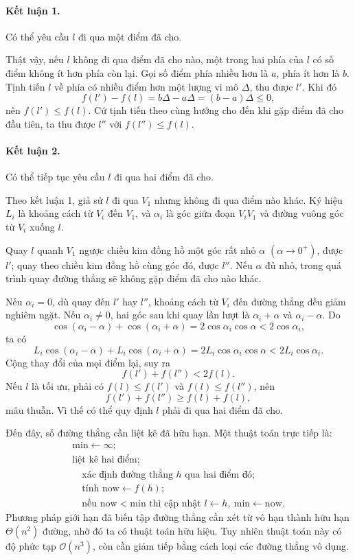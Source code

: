 \documentclass[11pt]{article}
\newcommand{\Oh}{\mathcal{O}}
\begin{document}
\paragraph{Kết luận 1.}
Có thể yêu cầu \(l\) đi qua một điểm đã cho.

Thật vậy, nếu \(l\) không đi qua điểm đã cho nào, một trong hai phía của \(l\)
có số điểm không ít hơn phía còn lại. Gọi số điểm phía nhiều hơn là \(a\), phía
ít hơn là \(b\). Tịnh tiến \(l\) về phía có nhiều điểm hơn một lượng vi mô
\(\Delta\), thu được \(l'\). Khi đó
\[
  f(l')-f(l)=b\Delta-a\Delta=(b-a)\Delta\le0,
\]
nên \(f(l')\le f(l)\). Cứ tịnh tiến theo cùng hướng cho đến khi gặp điểm đã
cho đầu tiên, ta thu được \(l''\) với \(f(l'')\le f(l)\).

\paragraph{Kết luận 2.}
Có thể tiếp tục yêu cầu \(l\) đi qua hai điểm đã cho.

Theo kết luận 1, giả sử \(l\) đi qua \(V_1\) nhưng không đi qua điểm nào khác.
Ký hiệu \(L_i\) là khoảng cách từ \(V_i\) đến \(V_1\), và \(\alpha_i\) là góc
giữa đoạn \(V_iV_1\) và đường vuông góc từ \(V_i\) xuống \(l\).

Quay \(l\) quanh \(V_1\) ngược chiều kim đồng hồ một góc rất nhỏ \(\alpha\)
\((\alpha\to0^+)\), được \(l'\); quay theo chiều kim đồng hồ cùng góc đó, được
\(l''\). Nếu \(\alpha\) đủ nhỏ, trong quá trình quay đường thẳng sẽ không gặp
điểm đã cho nào khác.

Nếu \(\alpha_i=0\), dù quay đến \(l'\) hay \(l''\), khoảng cách từ \(V_i\) đến
đường thẳng đều giảm nghiêm ngặt. Nếu \(\alpha_i\ne0\), hai góc sau khi quay
lần lượt là \(\alpha_i+\alpha\) và \(\alpha_i-\alpha\). Do
\[
  \cos(\alpha_i-\alpha)+\cos(\alpha_i+\alpha)
  =2\cos\alpha_i\cos\alpha<2\cos\alpha_i,
\]
ta có
\[
  L_i\cos(\alpha_i-\alpha)+L_i\cos(\alpha_i+\alpha)
  =2L_i\cos\alpha_i\cos\alpha<2L_i\cos\alpha_i.
\]
Cộng thay đổi của mọi điểm lại, suy ra
\[
  f(l')+f(l'')<2f(l).
\]
Nếu \(l\) là tối ưu, phải có \(f(l)\le f(l')\) và \(f(l)\le f(l'')\), nên
\[
  f(l')+f(l'')\ge f(l)+f(l),
\]
mâu thuẫn. Vì thế có thể quy định \(l\) phải đi qua hai điểm đã cho.

Đến đây, số đường thẳng cần liệt kê đã hữu hạn. Một thuật toán trực tiếp là:
\[
\begin{array}{l}
\text{min}\leftarrow\infty;\\
\text{liệt kê hai điểm;}\\
\quad\text{xác định đường thẳng }h\text{ qua hai điểm đó;}\\
\quad\text{tính }\text{now}\leftarrow f(h);\\
\quad\text{nếu }\text{now}<\text{min}\text{ thì cập nhật }l\leftarrow h,\ 
  \text{min}\leftarrow \text{now}.
\end{array}
\]
Phương pháp giới hạn đã biến tập đường thẳng cần xét từ vô hạn thành hữu hạn
\(\Theta(n^2)\) đường, nhờ đó ta có thuật toán hữu hiệu. Tuy nhiên thuật toán
này có độ phức tạp \(\Oh(n^3)\), còn cần giảm tiếp bằng cách loại các đường
thẳng vô dụng.
\end{document}
